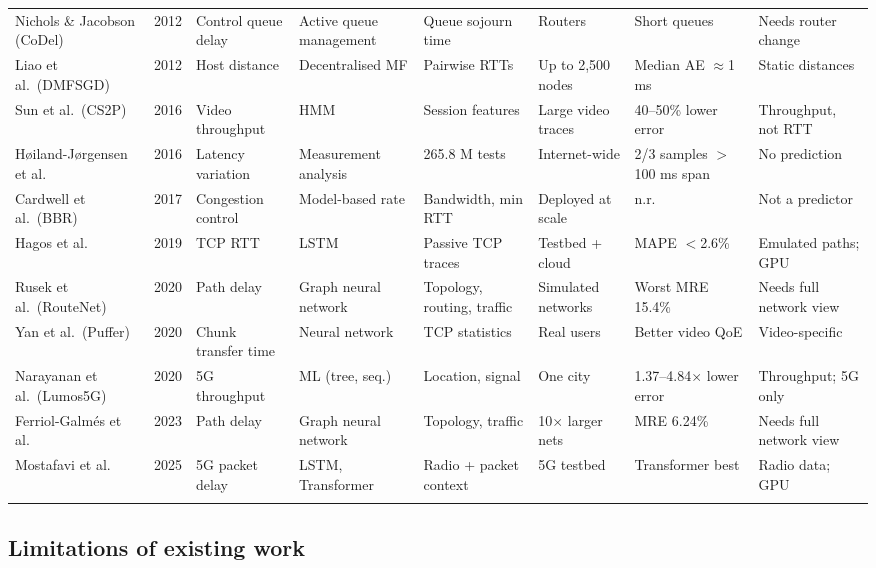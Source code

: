 \documentclass[pdflatex,sn-mathphys-num]{sn-jnl}
\begin{document}
\begin{table}
\begin{tabular}{@{}p{2.8cm}p{0.6cm}p{2.5cm}p{2.7cm}p{2.9cm}p{2.6cm}p{2.9cm}p{3.6cm}@{}}
Nichols \& Jacobson (CoDel) \cite{nichols2012codel} & 2012 & Control queue delay & Active queue management & Queue sojourn time & Routers & Short queues & Needs router change \\
Liao et al.\ (DMFSGD) \cite{liao2012dmfsgd} & 2012 & Host distance & Decentralised MF & Pairwise RTTs & Up to 2,500 nodes & Median AE $\approx$1 ms & Static distances \\
Sun et al.\ (CS2P) \cite{sun2016cs2p} & 2016 & Video throughput & HMM & Session features & Large video traces & 40--50\% lower error & Throughput, not RTT \\
H{\o}iland-J{\o}rgensen et al.\ \cite{hoiland2016latency} & 2016 & Latency variation & Measurement analysis & 265.8 M tests & Internet-wide & 2/3 samples $>$100 ms span & No prediction \\
Cardwell et al.\ (BBR) \cite{cardwell2017bbr} & 2017 & Congestion control & Model-based rate & Bandwidth, min RTT & Deployed at scale & n.r. & Not a predictor \\
Hagos et al.\ \cite{hagos2019rtt} & 2019 & TCP RTT & LSTM & Passive TCP traces & Testbed + cloud & MAPE $<$2.6\% & Emulated paths; GPU \\
Rusek et al.\ (RouteNet) \cite{rusek2020routenet} & 2020 & Path delay & Graph neural network & Topology, routing, traffic & Simulated networks & Worst MRE 15.4\% & Needs full network view \\
Yan et al.\ (Puffer) \cite{yan2020puffer} & 2020 & Chunk transfer time & Neural network & TCP statistics & Real users & Better video QoE & Video-specific \\
Narayanan et al.\ (Lumos5G) \cite{narayanan2020lumos5g} & 2020 & 5G throughput & ML (tree, seq.) & Location, signal & One city & 1.37--4.84$\times$ lower error & Throughput; 5G only \\
Ferriol-Galm{\'e}s et al.\ \cite{ferriol2023fermi} & 2023 & Path delay & Graph neural network & Topology, traffic & 10$\times$ larger nets & MRE 6.24\% & Needs full network view \\
Mostafavi et al.\ \cite{mostafavi2025delay} & 2025 & 5G packet delay & LSTM, Transformer & Radio + packet context & 5G testbed & Transformer best & Radio data; GPU \\
\botrule
\end{tabular}
\end{table}

\subsection{Limitations of existing work}\label{sec:limitations}
\end{document}
